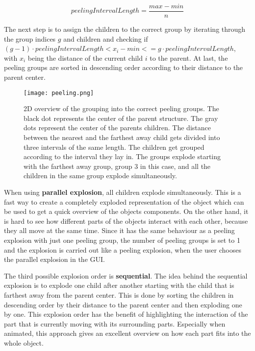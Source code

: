 \documentclass[draft,final]{vutinfth} %
\begin{document}
\begin{equation}
\label{eq:peelInterval}
peelingIntervalLength = \frac{max - min}{n}
\end{equation}

The next step is to assign the children to the correct group by iterating through the group indices $g$ and children and checking if $ (g - 1) \cdot peelingIntervalLength < x_i - min <= g \cdot peelingIntervalLength$, with $x_i$ being the distance of the current child $i$ to the parent. At last, the peeling groups are sorted in descending order according to their distance to the parent center.

\begin{figure}
\centering
\texttt{[image: peeling.png]}
\caption{2D overview of the grouping into the correct peeling groups. The black dot represents the center of the parent structure. The gray dots represent the center of the parents children. The distance between the nearest and the farthest away child gets divided into three intervals of the same length. The children get grouped according to the interval they lay in. The groups explode starting with the farthest away group, group 3 in this case, and all the children in the same group explode simultaneously.}
\label{fig:peeling}
\end{figure}

\par When using \textbf{parallel explosion}, all children explode simultaneously. 
This is a fast way to create a completely exploded representation of the object which can be used to get a quick overview of the objects components. 
On the other hand, it is hard to see how different parts of the objects interact with each other, because they all move at the same time. 
Since it has the same behaviour as a peeling explosion with just one peeling group, the number of peeling groups is set to 1 and the explosion is carried out like a peeling explosion, when the user chooses the parallel explosion in the GUI.

\par The third possible explosion order is \textbf{sequential}. 
The idea behind the sequential explosion is to explode one child after another starting with the child that is farthest away from the parent center. 
This is done by sorting the children in descending order by their distance to the parent center and then exploding one by one. 
This explosion order has the benefit of highlighting the interaction of the part that is currently moving with its surrounding parts. 
Especially when animated, this approach gives an excellent overview on how each part fits into the whole object.
\end{document}
